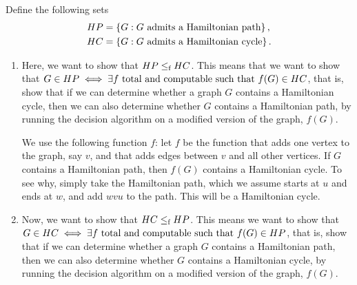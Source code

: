 \begin{solution}
	Define the following sets
	\begin{align*}
	HP &= \{G : G \textnormal{ admits a Hamiltonian path}\}\,,\\
	HC &= \{G : G \textnormal{ admits a Hamiltonian cycle}\}\,.\\
	\end{align*}
	\begin{enumerate}
		\item Here, we want to show that \(HP \le_\textnormal{f} HC\).
		This means that we want to show that
		\(G \in HP \iff \exists f
		\textnormal{ total and computable such that } f(G) \in HC\),
		that is, show that if we can determine
		whether a graph \(G\) contains a Hamiltonian cycle,
		then we can also determine
		whether \(G\) contains a Hamiltonian path,
		by running the decision algorithm
		on a modified version of the graph, \(f(G)\).

		We use the following function \(f\):
		let \(f\) be the function that adds one vertex to the graph,
		say \(v\), and that adds edges between \(v\)
		and all other vertices.
		If \(G\) contains a Hamiltonian path,
		then \(f(G)\) contains a Hamiltonian cycle.
		To see why, simply take the Hamiltonian path,
		which we assume starts at \(u\) and ends at \(w\),
		and add \(wvu\) to the path.
		This will be a Hamiltonian cycle.
		\item Now, we want to show that \(HC \le_\textnormal{f} HP\).
		This means we want to show that
		\(G \in HC \iff \exists f
		\textnormal{ total and computable such that } f(G) \in HP\),
		that is, show that if we can determine
		whether a graph \(G\) contains a Hamiltonian path,
		then we can also determine
		whether \(G\) contains a Hamiltonian cycle,
		by running the decision algorithm
		on a modified version of the graph, \(f(G)\).


\end{enumerate}
\end{solution}
